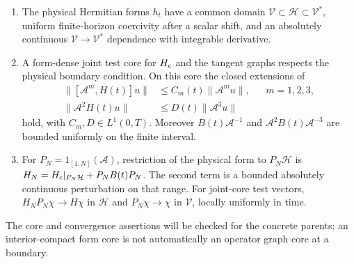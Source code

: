\documentclass[11pt]{article}
\numberwithin{equation}{section}
\theoremstyle{definition}
\theoremstyle{remark}
\begin{document}
\begin{enumerate}
\item The physical Hermitian forms $h_t$ have a common domain
$\mathcal V\subset\mathcal H\subset\mathcal V^*$,
uniform finite-horizon coercivity after a scalar shift, and an
absolutely continuous $\mathcal V\to\mathcal V^*$ dependence with
integrable derivative.
\item A form-dense joint test core for $H_{\rm c}$ and the tangent
graphs respects the physical boundary condition. On this core the
closed extensions of
\begin{align}
 \|[\mathcal A^m,H(t)]u\|&\leq C_m(t)\|\mathcal A^m u\|,
                 &&m=1,2,3,\label{p3d:eq:comm}\\
 \|\mathcal A^2\dot H(t)u\|&\leq D(t)\|\mathcal A^3u\|
                 \label{p3d:eq:timeder}
\end{align}
hold, with $C_m,D\in L^1(0,T)$. Moreover
$B(t)\mathcal A^{-1}$ and
$\mathcal A^2 B(t)\mathcal A^{-3}$ are bounded uniformly on the
finite interval.
\item For $P_N=1_{[1,N]}(\mathcal A)$, restriction of the physical
form to $P_N\mathcal H$ is
$H_N=H_{\rm c}|_{P_N\mathcal H}+P_NB(t)P_N$.
The second term is a bounded absolutely continuous perturbation
on that range. For joint-core test vectors,
$H_NP_N\chi\to H\chi$ in $\mathcal H$ and
$P_N\chi\to\chi$ in $\mathcal V$, locally uniformly in time.
\end{enumerate}
The core and convergence assertions will be checked for the concrete
parents; an interior-compact form core is not automatically an
operator graph core at a boundary.
\end{document}

